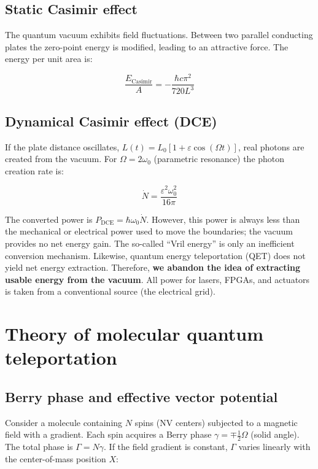\documentclass[12pt,a4paper]{article}
\begin{document}
\subsection{Static Casimir effect}
The quantum vacuum exhibits field fluctuations. Between two parallel conducting plates the zero-point energy is modified, leading to an attractive force. The energy per unit area is:

\begin{equation}
\frac{E_{\text{Casimir}}}{A} = -\frac{\hbar c \pi^2}{720 L^3}
\end{equation}

\subsection{Dynamical Casimir effect (DCE)}
If the plate distance oscillates, $L(t)=L_0[1+\varepsilon\cos(\Omega t)]$, real photons are created from the vacuum. For $\Omega=2\omega_0$ (parametric resonance) the photon creation rate is:

\begin{equation}
\dot{N} = \frac{\varepsilon^2 \omega_0^2}{16\pi} \label{eq:dce}
\end{equation}

The converted power is $P_{\text{DCE}} = \hbar\omega_0\dot{N}$. However, this power is always less than the mechanical or electrical power used to move the boundaries; the vacuum provides no net energy gain. The so-called ``Vril energy'' is only an inefficient conversion mechanism. Likewise, quantum energy teleportation (QET) \cite{Hotta2008} does not yield net energy extraction. Therefore, \textbf{we abandon the idea of extracting usable energy from the vacuum}. All power for lasers, FPGAs, and actuators is taken from a conventional source (the electrical grid).

\section{Theory of molecular quantum teleportation}

\subsection{Berry phase and effective vector potential}
Consider a molecule containing $N$ spins (NV centers) subjected to a magnetic field with a gradient. Each spin acquires a Berry phase $\gamma = \mp\frac12\Omega$ (solid angle). The total phase is $\Gamma = N\gamma$. If the field gradient is constant, $\Gamma$ varies linearly with the center-of-mass position $X$:
\end{document}
